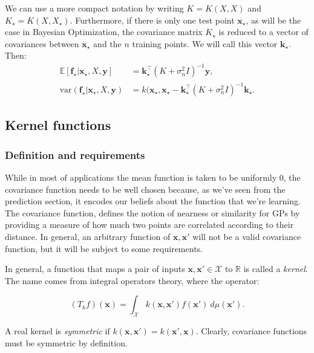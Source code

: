 \documentclass{article}
\begin{document}
	We can use a more compact notation by writing $K = K(X,X)$ and $K_\star = K(X, X_\star)$. Furthermore, if there is only one test point $\mathbf{x}_\star$, as will be the case in Bayesian Optimization, the covariance matrix $K_\star$ is reduced to a vector of covariances between $\mathbf{x}_\star$ and the $n$ training points. We will call this vector $\mathbf{k}_\star$. Then:
	\begin{equation}
		\begin{split}
			\mathbb{E}[\mathbf{f}_\star | \mathbf{x}_\star,X,\mathbf{y}] & = \mathbf{k}_\star^{\top} (K + \sigma^2_n I)^{-1} \mathbf{y}, \\
			\text{var}(\mathbf{f}_\star | \mathbf{x}_\star,X,\mathbf{y}) & = k(\mathbf{x_\star, \mathbf{x}_\star} - \mathbf{k}_\star^\top (K + \sigma^2_n I)^{-1} \mathbf{k}_\star .
		\end{split}
	\end{equation}
	
	\subsection{Kernel functions}
	\subsubsection{Definition and requirements}
	While in most of applications the mean function is taken to be uniformly 0, the covariance function needs to be well chosen because, as we've seen from the prediction section, it encodes our beliefs about the function that we're learning. The covariance function, defines the notion of nearness or similarity for GPs by providing a measure of how much two points are correlated according to their distance. In general, an arbitrary function of $\mathbf{x}, \mathbf{x'}$ will not be a valid covariance function, but it will be subject to some requirements.
	
	In general, a function that maps a pair of inputs $\mathbf{x}, \mathbf{x'} \in \mathcal{X}$ to $\mathbb{R}$ is called a \textit{kernel}. The name comes from integral operators theory, where the operator:
	
	\begin{equation}
		(T_k f)(\mathbf{x}) = \int_\mathcal{X} k(\mathbf{x}, \mathbf{x'}) f(\mathbf{x'}) \ d \mu (\mathbf{x'}).
	\end{equation}
	
	A real kernel is \textit{symmetric} if $k(\mathbf{x}, \mathbf{x'}) = k(\mathbf{x'}, \mathbf{x})$. Clearly, covariance functions must be symmetric by definition.
	
\end{document}
